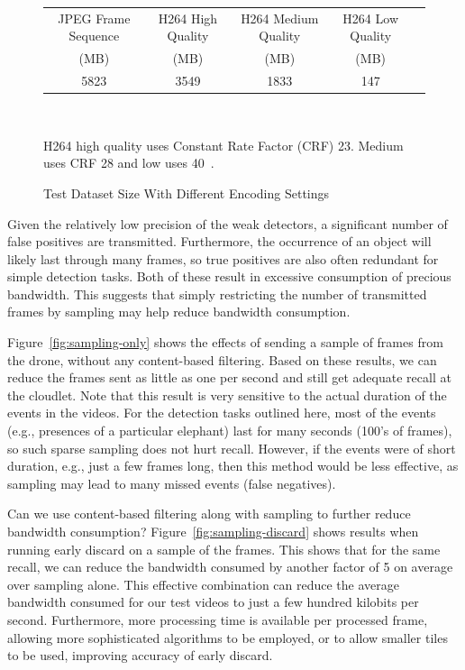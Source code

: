 \begin{figure}[h]
\centering
\begin{tabular}{|c|c|c|c|c|}
\hline
JPEG Frame Sequence  & H264 High Quality  & H264 Medium Quality & H264 Low Quality \\
(MB) & (MB) & (MB) & (MB)\\
\hline
5823 & 3549  & 1833 & 147\\
\hline
\end{tabular}\\
\vspace{0.1in}
\begin{captiontext}
H264 high quality uses Constant Rate Factor (CRF) 23. Medium
uses CRF 28 and low uses 40~\cite{Merritt2007}.
\end{captiontext}
\caption{Test Dataset Size With Different Encoding Settings}
\label{fig:video-vs-images}
\end{figure}

Given the relatively low precision of the weak detectors, a significant number 
of false positives are transmitted.  Furthermore, the occurrence of an object will
likely last through many frames, so true positives are also often redundant for 
simple detection tasks.  Both of these result in excessive
consumption of precious bandwidth.  
This suggests that simply restricting the number of transmitted
frames by sampling may help reduce bandwidth consumption.  

Figure~\ref{fig:sampling-only} shows the effects of 
sending a sample of frames from the drone, without any
content-based filtering.  Based on these results, we can reduce
the frames sent as little as one per second and still get
adequate recall at the cloudlet.  Note that this result is very
sensitive to the actual duration of the events in the videos.
For the detection tasks outlined here, most of the events (e.g.,
presences of a particular elephant) last for many seconds (100's
of frames), so such sparse sampling does not hurt recall.
However, if the events were of short duration, e.g., just a few
frames long, then this method would be less effective, as
sampling may lead to many missed events (false negatives).  

Can we use content-based filtering along with sampling to further
reduce bandwidth consumption?  Figure~\ref{fig:sampling-discard}
shows results when running early discard on a sample of the
frames. This shows that for the same recall, we can reduce the
bandwidth consumed by another factor of 5 on average over sampling alone.
This effective combination can reduce the average bandwidth
consumed for our test videos to just a few hundred kilobits
per second.  Furthermore, more processing time is available per
processed frame, allowing more sophisticated algorithms to be
employed, or to allow smaller tiles to be used, improving
accuracy of early discard.  

